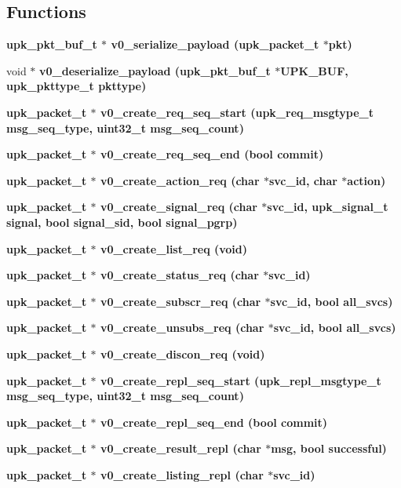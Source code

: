 \subsection*{Functions}
\begin{CompactItemize}
\item 
\bf{upk\_\-pkt\_\-buf\_\-t} $\ast$ \bf{v0\_\-serialize\_\-payload} (\bf{upk\_\-packet\_\-t} $\ast$pkt)
\item 
void $\ast$ \bf{v0\_\-deserialize\_\-payload} (\bf{upk\_\-pkt\_\-buf\_\-t} $\ast$UPK\_\-BUF, \bf{upk\_\-pkttype\_\-t} pkttype)
\item 
\bf{upk\_\-packet\_\-t} $\ast$ \bf{v0\_\-create\_\-req\_\-seq\_\-start} (\bf{upk\_\-req\_\-msgtype\_\-t} msg\_\-seq\_\-type, uint32\_\-t msg\_\-seq\_\-count)
\item 
\bf{upk\_\-packet\_\-t} $\ast$ \bf{v0\_\-create\_\-req\_\-seq\_\-end} (bool commit)
\item 
\bf{upk\_\-packet\_\-t} $\ast$ \bf{v0\_\-create\_\-action\_\-req} (char $\ast$svc\_\-id, char $\ast$action)
\item 
\bf{upk\_\-packet\_\-t} $\ast$ \bf{v0\_\-create\_\-signal\_\-req} (char $\ast$svc\_\-id, \bf{upk\_\-signal\_\-t} signal, bool signal\_\-sid, bool signal\_\-pgrp)
\item 
\bf{upk\_\-packet\_\-t} $\ast$ \bf{v0\_\-create\_\-list\_\-req} (void)
\item 
\bf{upk\_\-packet\_\-t} $\ast$ \bf{v0\_\-create\_\-status\_\-req} (char $\ast$svc\_\-id)
\item 
\bf{upk\_\-packet\_\-t} $\ast$ \bf{v0\_\-create\_\-subscr\_\-req} (char $\ast$svc\_\-id, bool all\_\-svcs)
\item 
\bf{upk\_\-packet\_\-t} $\ast$ \bf{v0\_\-create\_\-unsubs\_\-req} (char $\ast$svc\_\-id, bool all\_\-svcs)
\item 
\bf{upk\_\-packet\_\-t} $\ast$ \bf{v0\_\-create\_\-discon\_\-req} (void)
\item 
\bf{upk\_\-packet\_\-t} $\ast$ \bf{v0\_\-create\_\-repl\_\-seq\_\-start} (\bf{upk\_\-repl\_\-msgtype\_\-t} msg\_\-seq\_\-type, uint32\_\-t msg\_\-seq\_\-count)
\item 
\bf{upk\_\-packet\_\-t} $\ast$ \bf{v0\_\-create\_\-repl\_\-seq\_\-end} (bool commit)
\item 
\bf{upk\_\-packet\_\-t} $\ast$ \bf{v0\_\-create\_\-result\_\-repl} (char $\ast$msg, bool successful)
\item 
\bf{upk\_\-packet\_\-t} $\ast$ \bf{v0\_\-create\_\-listing\_\-repl} (char $\ast$svc\_\-id)
\item 

\end{CompactItemize}
